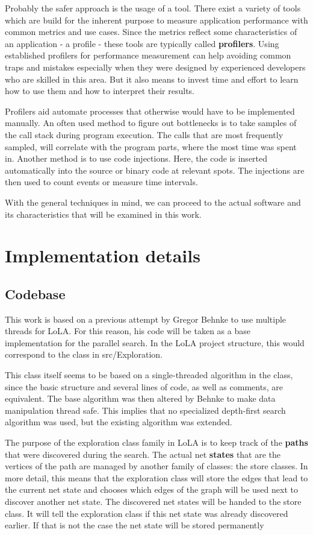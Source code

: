 Probably the safer approach is the usage of a tool. There exist a variety of tools which are build for the inherent purpose to measure application performance with common metrics and use cases. Since the metrics reflect some characteristics of an application - a profile - these tools are typically called \textbf{profilers}. Using established profilers for performance measurement can help avoiding common traps and mistakes especially when they were designed by experienced developers who are skilled in this area. But it also means to invest time and effort to learn how to use them and how to interpret their results.

Profilers aid automate processes that otherwise would have to be implemented manually. An often used method to figure out bottlenecks is to take samples of the call stack during program execution. The calls that are most frequently sampled, will correlate with the program parts, where the most time was spent in. Another method is to use code injections. Here, the code is inserted automatically into the source or binary code at relevant spots. The injections are then used to count events or measure time intervals.

With the general techniques in mind, we can proceed to the actual software and its characteristics that will be examined in this work.

\section{Implementation details}
\subsection{Codebase}
\label{codeBase}
This work is based on a previous attempt by Gregor Behnke to use multiple threads for LoLA. For this reason, his code will be taken as a base implementation for the parallel search. In the LoLA project structure, this would correspond to the  class in src/Exploration.

This class itself seems to be based on a single-threaded algorithm in the  class, since the basic structure and several lines of code, as well as comments, are equivalent. The base algorithm was then altered by Behnke to make data manipulation thread safe. This implies that no specialized depth-first search algorithm was used, but the existing algorithm was extended.

The purpose of the exploration class family in LoLA is to keep track of the \textbf{paths} that were discovered during the search. The actual net \textbf{states} that are the vertices of the path are managed by another family of classes: the store classes. In more detail, this means that the exploration class will store the edges that lead to the current net state and chooses which edges of the graph will be used next to discover another net state. The discovered net states will be handed to the store class. It will tell the exploration class if this net state was already discovered earlier. If that is not the case the net state will be stored permanently

